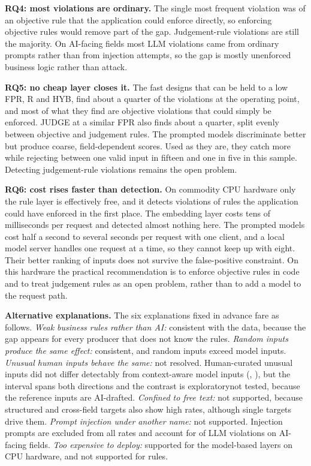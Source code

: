 \documentclass[conference]{IEEEtran}
\begin{document}
\textbf{RQ4: most violations are ordinary.} The single most frequent violation was of an objective rule
that the application could enforce directly, so enforcing objective rules would remove part of the gap.
Judgement-rule violations are still the majority. On AI-facing fields most LLM violations came from
ordinary prompts rather than from injection attempts, so the gap is mostly unenforced business logic
rather than attack.

\textbf{RQ5: no cheap layer closes it.} The fast designs that can be held to a low FPR, R and HYB, find
about a quarter of the violations at the operating point, and most of what they find are objective
violations that could simply be enforced. JUDGE at a similar FPR also finds about a quarter, split
evenly between objective and judgement rules. The prompted models discriminate better but produce
coarse, field-dependent scores. Used as they are, they catch more while rejecting between one valid
input in fifteen and one in five in this sample. Detecting judgement-rule violations remains the open
problem.

\textbf{RQ6: cost rises faster than detection.} On commodity CPU hardware only the rule layer is
effectively free, and it detects violations of rules the application could have enforced in the first
place. The embedding layer costs tens of milliseconds per request and detected almost nothing here. The
prompted models cost half a second to several seconds per request with one client, and a local model
server handles one request at a time, so they cannot keep up with eight. Their better ranking of inputs
does not survive the false-positive constraint. On this hardware the practical recommendation is to
enforce objective rules in code and to treat judgement rules as an open problem, rather than to add a
model to the request path.

\textbf{Alternative explanations.} The six explanations fixed in advance fare as follows. \emph{Weak
business rules rather than AI:} consistent with the data, because the gap appears for every producer
that does not know the rules. \emph{Random inputs produce the same effect:} consistent, and random
inputs exceed model inputs. \emph{Unusual human inputs behave the same:} \ifreviewed not resolved.
Human-curated unusual inputs did not differ detectably from context-aware model inputs
(, ), but the interval spans both directions and the contrast is
exploratory\else not tested, because the reference inputs are AI-drafted\fi. \emph{Confined to free
text:} not supported, because structured and cross-field targets also show high rates, although single
targets drive them. \emph{Prompt injection under another name:} not supported. Injection prompts are
excluded from all rates and account for  of  LLM violations on AI-facing
fields. \emph{Too expensive to deploy:} supported for the model-based layers on CPU hardware, and not
supported for rules.
\end{document}
